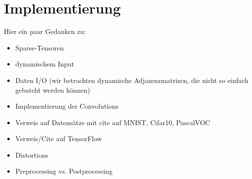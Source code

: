 \chapter{Implementierung}

Hier ein paar Gedanken zu:

\begin{itemize}
  \item Sparse-Tensoren
  \item dynamischem Input
  \item Daten I/O (wir betrachten dynamische Adjazenzmatrizen, die nicht so einfach gebatcht werden können)
  \item Implementierung der Convolutions
  \item Verweis auf Datensätze mit cite auf MNIST, Cifar10, PascalVOC
  \item Verweis/Cite auf TensorFlow
  \item Distortions
  \item Preprocessing vs. Postprocessing
\end{itemize}
